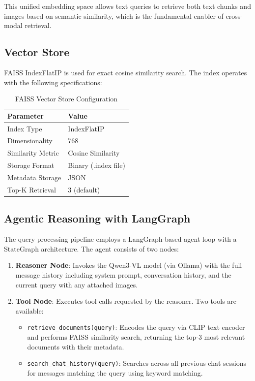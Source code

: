 \documentclass[conference]{IEEEtran}
\begin{document}
This unified embedding space allows text queries to retrieve both text chunks and images based on semantic similarity, which is the fundamental enabler of cross-modal retrieval.

\subsection{Vector Store}

FAISS IndexFlatIP is used for exact cosine similarity search. The index operates with the following specifications:

\begin{table}[H]
\centering
\caption{FAISS Vector Store Configuration}
\label{tab:faiss_config}
\begin{tabular}{ll}
\toprule
\textbf{Parameter} & \textbf{Value} \\
\midrule
Index Type & IndexFlatIP \\
Dimensionality & 768 \\
Similarity Metric & Cosine Similarity \\
Storage Format & Binary (.index file) \\
Metadata Storage & JSON \\
Top-K Retrieval & 3 (default) \\
\bottomrule
\end{tabular}
\end{table}

\subsection{Agentic Reasoning with LangGraph}

The query processing pipeline employs a LangGraph-based agent loop with a StateGraph architecture. The agent consists of two nodes:

\begin{enumerate}
    \item \textbf{Reasoner Node}: Invokes the Qwen3-VL model (via Ollama) with the full message history including system prompt, conversation history, and the current query with any attached images.
    \item \textbf{Tool Node}: Executes tool calls requested by the reasoner. Two tools are available:
    \begin{itemize}
        \item \texttt{retrieve\_documents(query)}: Encodes the query via CLIP text encoder and performs FAISS similarity search, returning the top-3 most relevant documents with their metadata.
        \item \texttt{search\_chat\_history(query)}: Searches across all previous chat sessions for messages matching the query using keyword matching.
    \end{itemize}
\end{enumerate}
\end{document}
